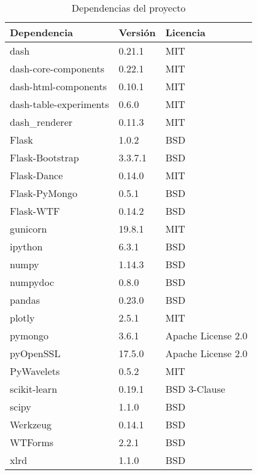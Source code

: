 \begin{table}[]
	\centering
	\begin{tabular}{lll}
		\hline
		Dependencia            & Versión & Licencia           \\
		\hline
		dash                   & 0.21.1  & MIT                \\
		dash-core-components   & 0.22.1  & MIT                \\
		dash-html-components   & 0.10.1  & MIT                \\
		dash-table-experiments & 0.6.0   & MIT                \\
		dash\_renderer         & 0.11.3  & MIT                \\
		Flask                  & 1.0.2   & BSD                \\
		Flask-Bootstrap        & 3.3.7.1 & BSD                \\
		Flask-Dance            & 0.14.0  & MIT                \\
		Flask-PyMongo          & 0.5.1   & BSD                \\
		Flask-WTF              & 0.14.2  & BSD                \\
		gunicorn               & 19.8.1  & MIT                \\
		ipython                & 6.3.1   & BSD                \\
		numpy                  & 1.14.3  & BSD                \\
		numpydoc               & 0.8.0   & BSD                \\
		pandas                 & 0.23.0  & BSD                \\
		plotly                 & 2.5.1   & MIT                \\
		pymongo                & 3.6.1   & Apache License 2.0 \\
		pyOpenSSL              & 17.5.0  & Apache License 2.0 \\
		PyWavelets             & 0.5.2   & MIT                \\
		scikit-learn           & 0.19.1  & BSD 3-Clause       \\
		scipy                  & 1.1.0   & BSD                \\
		Werkzeug               & 0.14.1  & BSD                \\
		WTForms                & 2.2.1   & BSD                \\
		xlrd                   & 1.1.0   & BSD                \\
		\hline
	\end{tabular}
	\caption{Dependencias del proyecto}
	\label{tab:dependencias}
\end{table}

